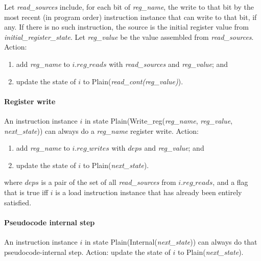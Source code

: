 Let {\it read\_sources} include, for each bit of {\it reg\_name}, the write to
that bit by the most recent (in program order) instruction instance that can write to that bit, if any. If there is no such instruction, the source is the initial register value from {\it initial\_register\_state}.
Let  {\it reg\_value} be the value assembled from {\it read\_sources}.
Action:
\begin{enumerate}
\item add {\it reg\_name} to $i.\textit{reg\_reads}$ with {\it read\_sources} and {\it reg\_value}; and
\item update the state of $i$ to {\sc Plain}({\it read\_cont(reg\_value)}).
\end{enumerate}


\paragraph{Register write}\label{omm:reg_write}
An instruction instance $i$ in state {\sc Plain}({\sc Write\_reg}({\it reg\_name}, {\it reg\_value}, {\it next\_state})) can always do a {\it reg\_name} register write.
Action:
\begin{enumerate}
\item add {\it reg\_name} to $i.\textit{reg\_writes}$ with $deps$ and {\it reg\_value}; and
\item update the state of $i$ to {\sc Plain}({\it next\_state}).
\end{enumerate}
where $deps$ is a pair of the set of all {\it read\_sources} from $i.\textit{reg\_reads}$, and a flag that is true iff $i$ is a load instruction instance that has already been entirely satisfied.


\paragraph{Pseudocode internal step}\label{omm:sail_interp}
An instruction instance $i$ in state {\sc Plain}({\sc Internal}({\it next\_state})) can always do that pseudocode-internal step.
Action: update the state of $i$ to {\sc Plain}({\it next\_state}).


